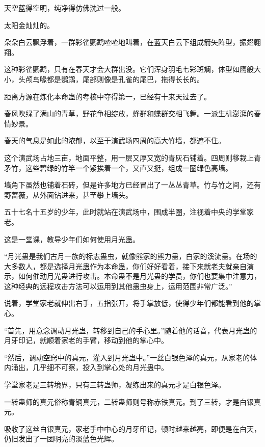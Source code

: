 
\begin{this_body}



天空蓝得空明，纯净得仿佛洗过一般。

太阳金灿灿的。

朵朵白云飘浮着，一群彩雀鹦鹉喳喳地叫着，在蓝天白云下组成箭矢阵型，振翅翱翔。

这种彩雀鹦鹉，只有在春天才会大群出没。它们浑身羽毛七彩斑斓，体型如鹰般大小，头颅鸟喙都是鹦鹉，尾部则像是孔雀的尾巴，拖得长长的。

距离方源在炼化本命蛊的考核中夺得第一，已经有十来天过去了。

春风吹绿了满山的青草，野花争相绽放，蜂群和蝶群交相飞舞。一派生机澎湃的春情妙景。

春天的气息是如此的浓郁，以至于演武场四周的高大竹墙，都遮不住。

这个演武场占地三亩，地面平整，用一层又厚又宽的青灰石铺着。四周则移栽上青矛竹，这些碧绿的竹竿一个紧挨着一个，又直又挺，组成一圈绿色高墙。

墙角下虽然也铺着石砖，但是许多地方已经冒出了一丛丛青草。竹与竹之间，还有野蔷薇，从外面钻进来，甚至攀上墙头。

五十七名十五岁的少年，此时就站在演武场中，围成半圈，注视着中央的学堂家老。

这是一堂课，教导少年们如何使用月光蛊。

“月光蛊是我们古月一族的标志蛊虫，就像熊家的熊力蛊，白家的溪流蛊。在场的大多数人，都是选择月光蛊作为本命蛊，你们好好看着，接下来就老夫就亲自演示，如何催动月光蛊进行攻击。本命蛊不是月光蛊的学员，你们也要集中注意力，这种经典的远程攻击方法可以运用到其他蛊虫身上，运用范围非常广泛。”

说着，学堂家老就伸出右手，五指张开，将手掌放低，使得少年们都能看到他的掌心。

“首先，用意念调动月光蛊，转移到自己的手心里。”随着他的话音，代表月光蛊的月牙印记，就顺着家老的手臂，移动到他的掌心中。

“然后，调动空窍中的真元，灌入到月光蛊中。”一丝白银色泽的真元，从家老的体内涌出，几乎细不可察，投入到掌心处的月光蛊中。

学堂家老是三转境界，只有三转蛊师，凝练出来的真元才是白银色泽。

一转蛊师的真元俗称青铜真元，二转蛊师则号称赤铁真元。到了三转，才是白银真元。

吸收了这丝白银真元，家老手中中心的月牙印记，顿时越来越亮，即便是在白天，仍旧发出了一团明亮的淡蓝色光辉。


\end{this_body}
